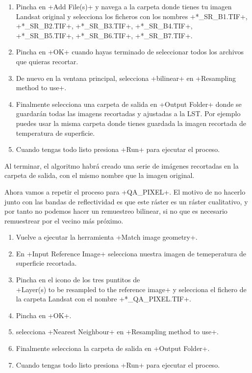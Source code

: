 \documentclass[a4paper,11pt]{article}
\begin{document}
\begin{enumerate}
      \item Pincha en \cverb+Add File(s)+ y navega a la carpeta donde tienes tu imagen Landsat original y selecciona los ficheros con los nombres \cverb+*_SR_B1.TIF+, \cverb+*_SR_B2.TIF+, \cverb+*_SR_B3.TIF+, \cverb+*_SR_B4.TIF+, \cverb+*_SR_B5.TIF+, \cverb+*_SR_B6.TIF+, \cverb+*_SR_B7.TIF+.
      
      \item Pincha en \cverb+OK+ cuando hayas terminado de seleccionar todos los archivos que quieras recortar.
      
      \item De nuevo en la ventana principal, selecciona \cverb+bilinear+ en \cverb+Resampling method to use+.
      
      \item Finalmente selecciona una carpeta de salida en \cverb+Output Folder+ donde se guardarán todas las imagens recortadas y ajustadas a la LST. Por ejemplo puedes usar la misma carpeta donde tienes guardada la imagen recortada de temperatura de superficie.
      
      \item Cuando tengas todo listo presiona \cverb+Run+ para ejecutar el proceso.
    \end{enumerate}
    
    Al terminar, el algoritmo habrá creado una serie de imágenes recortadas en la carpeta de salida, con el mismo nombre que la imagen original.
    
    Ahora vamos a repetir el proceso para \cverb+QA_PIXEL+. El motivo de no hacerlo junto con las bandas de reflectividad es que este ráster es un ráster cualitativo, y por tanto no podemos hacer un remuestreo bilinear, si no que es necesario remuestrear por el vecino más próximo.
    
    \begin{enumerate}
     \item Vuelve a ejecutar la herramienta \cverb+Match image geometry+.
     
     \item En \cverb+Input Reference Image+ selecciona nuestra imagen de temeperatura de superficie recortada.
     
     \item Pincha en el icono de los tres puntitos de\\ \cverb+Layer(s) to be resampled to the reference image+ y selecciona el fichero de la carpeta Landsat con el nombre \cverb+*_QA_PIXEL.TIF+.
      
      \item Pincha en \cverb+OK+.
      
      \item selecciona \cverb+Nearest Neighbour+ en \cverb+Resampling method to use+.
      
      \item Finalmente selecciona la carpeta de salida en \cverb+Output Folder+.
      
      \item Cuando tengas todo listo presiona \cverb+Run+ para ejecutar el proceso.
    \end{enumerate}
  
\end{document}
